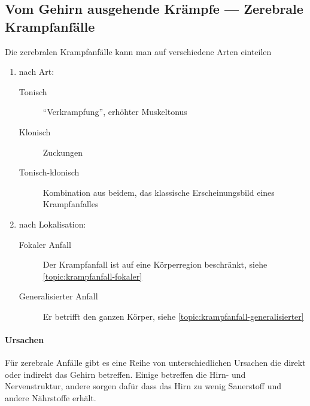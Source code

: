 
\subsection{Vom Gehirn ausgehende Krämpfe --- Zerebrale Krampfanfälle}
\label{topic:krampfanfall}


Die zerebralen Krampfanfälle kann man auf verschiedene Arten einteilen

\begin{enumerate}
    \item nach Art:
    \begin{description}
        \item[Tonisch] "`Verkrampfung"', erhöhter
        Muskeltonus
        \item[Klonisch] Zuckungen
        \item[Tonisch-klonisch] Kombination aus beidem, das
        klassische Erscheinungsbild eines Krampfanfalles
    \end{description}
    \item nach Lokalisation:
    
    \begin{description}
        \item [Fokaler Anfall] Der Krampfanfall ist auf
        eine Körperregion beschränkt, siehe
        \ref{topic:krampfanfall-fokaler}
        
        \item [Generalisierter Anfall] Er betrifft den
        ganzen Körper, siehe
        \ref{topic:krampfanfall-generalisierter}
        
    \end{description}
    \end{enumerate}

\paragraph{Ursachen}

Für zerebrale Anfälle gibt es eine Reihe von unterschiedlichen Ursachen die
direkt oder indirekt das Gehirn betreffen. Einige betreffen die Hirn- und
Nervenstruktur, andere sorgen dafür dass das Hirn zu wenig
Sauerstoff und andere Nährstoffe erhält. 

